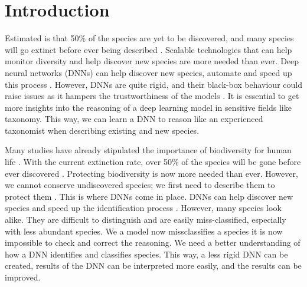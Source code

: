 \documentclass[a4paper, 12pt, oneside]{book} %
\begin{document}
\renewcommand{\thesection}{\arabic{section}}
\section{Introduction}

Estimated is that 50\% of the species are yet to be discovered, and many species will go extinct before ever being described \autocite{lees_species_2015}.
Scalable technologies that can help monitor diversity and help discover new species are more needed than ever.
Deep neural networks (DNNs) can help discover new species, automate and speed up this process \autocite{van_horn_inaturalist_2018}.
However, DNNs are quite rigid, and their black-box behaviour could raise issues as it hampers the trustworthiness of the models \autocite{carvalho_machine_2019}.
It is essential to get more insights into the reasoning of a deep learning model in sensitive fields like taxonomy.
This way, we can learn a DNN to reason like an experienced taxonomist when describing existing and new species.

Many studies have already stipulated the importance of biodiversity for human life \autocite{pimentel_economic_1997, gowdy_value_1997, raffaelli_links_2010, joppa_biodiversity_2011, pimm_how_2018}.
With the current extinction rate, over 50\% of the species will be gone before ever discovered \autocite{lees_species_2015}.
Protecting biodiversity is now more needed than ever.
However, we cannot conserve undiscovered species; we first need to describe them to protect them \autocite{joppa_biodiversity_2011}.
This is where DNNs come in place.
DNNs can help discover new species and speed up the identification process \autocite{van_horn_inaturalist_2018}.
However, many species look alike.
They are difficult to distinguish and are easily miss-classified, especially with less abundant species.
We a model now missclassifies a species it is now impossible to check and correct the reasoning.
We need a better understanding of how a DNN identifies and classifies species. 
This way, a less rigid DNN can be created, results of the DNN can be interpreted more easily, and the results can be improved.
\end{document}
